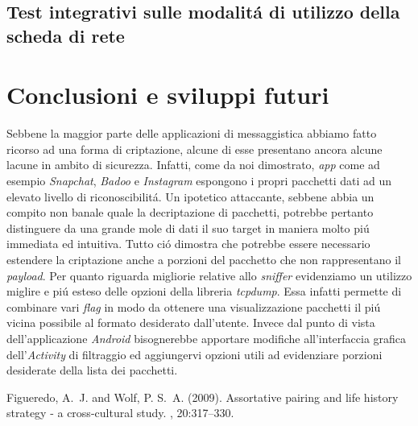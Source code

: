 \documentclass[12pt]{article} %
\begin{document}
\subsection{Test integrativi sulle modalit\'a di utilizzo della scheda di rete}



\section{Conclusioni e sviluppi futuri} %
Sebbene la maggior parte delle applicazioni di messaggistica abbiamo fatto ricorso ad una forma di criptazione, alcune di esse presentano ancora alcune lacune in ambito di sicurezza. Infatti, come da noi dimostrato, \textit{app} come ad esempio \textit{Snapchat}, \textit{Badoo} e \textit{Instagram} espongono i propri pacchetti dati ad un elevato livello di riconoscibilit\'a. Un ipotetico attaccante, sebbene abbia un compito non banale quale la decriptazione di pacchetti, potrebbe pertanto distinguere da una grande mole di dati il suo target in maniera molto pi\'u immediata ed intuitiva. Tutto ci\'o dimostra che potrebbe essere necessario estendere la criptazione anche a porzioni del pacchetto che non rappresentano il \textit{payload}.
Per quanto riguarda migliorie relative allo \textit{sniffer} evidenziamo un utilizzo miglire e pi\'u esteso delle opzioni della libreria \textit{tcpdump}. Essa infatti permette di combinare vari \textit{flag} in modo da ottenere una visualizzazione pacchetti il pi\'u vicina possibile al formato desiderato dall'utente. Invece dal punto di vista dell'applicazione \textit{Android} bisognerebbe apportare modifiche all'interfaccia grafica dell'\textit{Activity} di filtraggio ed aggiungervi opzioni utili ad evidenziare porzioni desiderate della lista dei pacchetti.




\begin{thebibliography}{99} %

Figueredo, A.~J. and Wolf, P. S.~A. (2009).
\newblock Assortative pairing and life history strategy - a cross-cultural
  study.
, 20:317--330.
 
\end{thebibliography}

\end{document}
